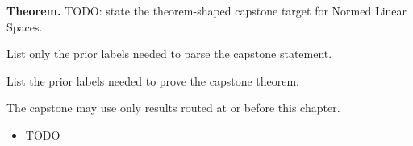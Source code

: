 \label{cap:normed-linear-spaces}

\begin{tcolorbox}[
  colback=gray!6,
  colframe=gray!40,
  arc=2pt,
  left=8pt, right=8pt, top=6pt, bottom=6pt,
  title={\small\textbf{Capstone Theorem}},
  fonttitle=\small\bfseries
]
\textbf{Theorem.}
TODO: state the theorem-shaped capstone target for Normed Linear Spaces.
\end{tcolorbox}

\begin{remark*}
List only the prior labels needed to parse the capstone statement.
\end{remark*}

\begin{remark*}
List the prior labels needed to prove the capstone theorem.
\end{remark*}

\begin{remark*}
The capstone may use only results routed at or before this chapter.
\end{remark*}

\begin{dependencies}
\begin{itemize}
  \item TODO
\end{itemize}
\end{dependencies}

\clearpage
